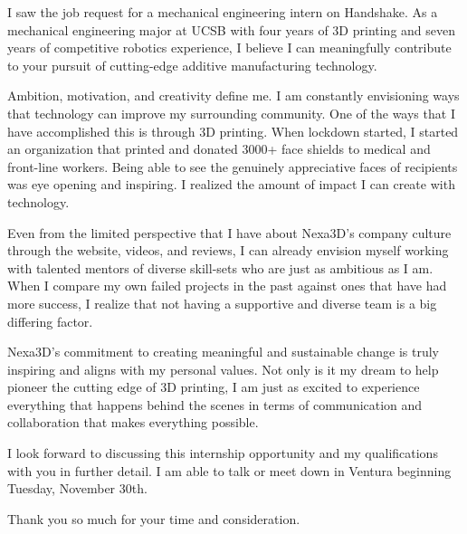 \documentclass[11pt, letterpaper]{awesome-cv} %
\begin{document}
\makecvheader %

\makelettertitle %


\begin{cvletter}


I saw the job request for a mechanical engineering intern on Handshake. As a mechanical engineering major at UCSB with four years of 3D printing and seven years of competitive robotics experience, I believe I can meaningfully contribute to your pursuit of cutting-edge additive manufacturing technology.


Ambition, motivation, and creativity define me. I am constantly envisioning ways that technology can improve my surrounding community. One of the ways that I have accomplished this is through 3D printing. When lockdown started, I started an organization that printed and donated 3000+ face shields to medical and front-line workers. Being able to see the genuinely appreciative faces of recipients was eye opening and inspiring. I realized the amount of impact I can create with technology.



Even from the limited perspective that I have about Nexa3D's company culture through the website, videos, and reviews, I can already envision myself working with talented mentors of diverse skill-sets who are just as ambitious as I am. When I compare my own failed projects in the past against ones that have had more success, I realize that not having a supportive and diverse team is a big differing factor. 

Nexa3D's commitment to creating meaningful and sustainable change is truly inspiring and aligns with my personal values. Not only is it my dream to help pioneer the cutting edge of 3D printing, I am just as excited to experience everything that happens behind the scenes in terms of communication and collaboration that makes everything possible.

I look forward to discussing this internship opportunity and my qualifications with you in further detail. I am able to talk or meet down in Ventura beginning Tuesday, November 30th. 

Thank you so much for your time and consideration.


\end{cvletter}


\makeletterclosing %
\end{document}
